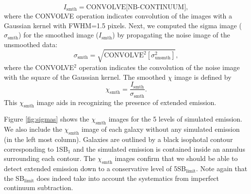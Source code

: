 \documentclass[twocolumn]{aastex61}
\begin{document}
\begin{equation}
I_{\text{smth}}= \text{CONVOLVE[NB-CONTINUUM]},
\end{equation}
where the CONVOLVE operation indicates convolution of the images with a Gaussian kernel with FWHM=1.5 pixels. Next, we computed the sigma image ($\sigma_{\text{smth}}$) for the smoothed image ($I_{\text{smth}}$) by propagating the noise image of the unsmoothed data:
\begin{equation}
\sigma_{\text{smth}}=\sqrt{\text{CONVOLVE}^2[\sigma^2_{\text{unsmth}}]},
\end{equation}
where the CONVOLVE$^2$ operation indicates the convolution of the noise image with the square of the Gaussian kernel. The smoothed $\chi$ image is defined by
\begin{equation}
\chi_{\text{smth}}=\frac{I_{\text{smth}}}{\sigma_{\text{smth}}}.
\end{equation}
This $\chi_{\text{smth}}$ image aids in recognizing the presence of extended  emission. 

Figure \ref{fig:sigmas} shows the $\chi_{\text{smth}}$ images for the 5 levels of simulated  emission. We also include the $\chi_{\text{smth}}$ image of each galaxy without any simulated emission (in the left most column). Galaxies are outlined by a black isophotal contour corresponding to 1SB$_1$ and the simulated emission is contained inside an annulus surrounding each contour. The  $\chi_{\text{smth}}$ images confirm that we should be able to detect extended  emission down to a conservative level of 5SB$_{\text{limit}}$. Note again that the SB$_{\text{limit}}$ does indeed take into account the systematics from imperfect continuum subtraction. 

\end{document}
